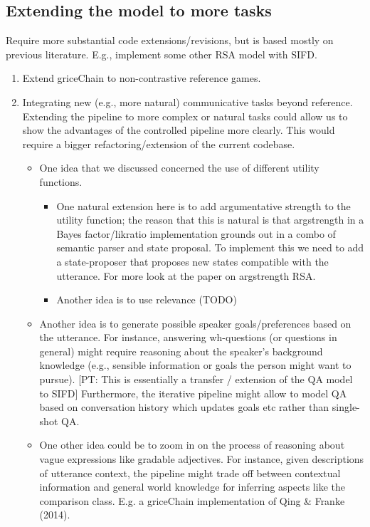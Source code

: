\documentclass[fleqn,reqno,10pt]{article}
\newcommand{\pt}[1]{\textcolor{CSP-accent-1}{[PT: #1]}}
\begin{document}
\subsection{Extending the model to more tasks}

Require more substantial code extensions/revisions, but is based mostly on previous literature. E.g., implement some other RSA model with SIFD.

\begin{enumerate}
  \item Extend griceChain to non-contrastive reference games.
  \item Integrating new (e.g., more natural) communicative tasks beyond reference. Extending the pipeline to more complex or natural tasks could allow us to show the advantages of the controlled pipeline more clearly. This would require a bigger refactoring/extension of the current codebase.
  \begin{itemize}
    \item One idea that we discussed concerned the use of different utility functions.
    \begin{itemize}
      \item One natural extension here is to add argumentative strength to the utility function; the reason that this is natural is that argstrength in a Bayes factor/likratio implementation grounds out in a combo of semantic parser and state proposal. To implement this we need to add a state-proposer that proposes new states compatible with the utterance. For more look at the paper on argstrength RSA.
      \item Another idea is to use relevance (TODO)
    \end{itemize}
    \item Another idea is to generate possible speaker goals/preferences based on the utterance. For instance, answering wh-questions (or questions in general) might require reasoning about the speaker's background knowledge (e.g., sensible information or goals the person might want to pursue). \pt{This is essentially a transfer / extension of the QA model to SIFD} Furthermore, the iterative pipeline might allow to model QA based on conversation history which updates goals etc rather than single-shot QA.
    \item One other idea could be to zoom in on the process of reasoning about vague expressions like gradable adjectives. For instance, given descriptions of utterance context, the pipeline might trade off between contextual information and general world knowledge for inferring aspects like the comparison class. E.g. a griceChain implementation of Qing \& Franke (2014).
  \end{itemize}
\end{enumerate}
\end{document}
